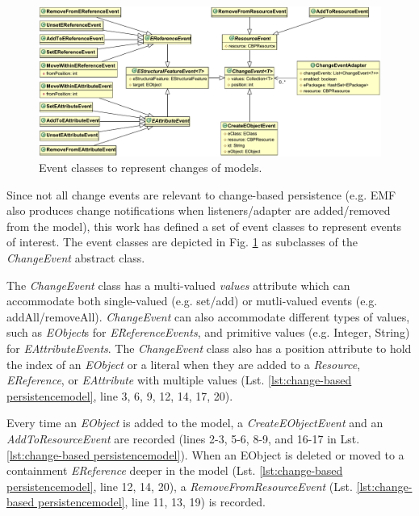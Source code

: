 \documentclass[12pt, a4paper]{report} \usepackage[titletoc]{appendix}
\begin{document}
\begin{figure}[th]
	\centering
	\includegraphics[width=\linewidth]{events}
	\caption{Event classes to represent changes of models.}
	\label{fig:events}
\end{figure}

Since not all change events are relevant to change-based persistence (e.g. EMF also produces change notifications when listeners/adapter are added/removed from the model), this work has defined a set of event classes to represent events of interest. The event classes are depicted in Fig. \ref{fig:events} as subclasses of the \emph{ChangeEvent} abstract class. 

The \emph{ChangeEvent} class has a multi-valued \emph{values} attribute which can accommodate both single-valued (e.g. set/add) or mutli-valued events (e.g. addAll/removeAll). \emph{ChangeEvent} can also accommodate different types of values, such as \emph{EObject}s for \emph{EReferenceEvents}, and primitive values (e.g. Integer, String) for \emph{EAttributeEvents}. The \emph{ChangeEvent} class also has a position attribute to hold the index of an \emph{EObject} or a literal when they are added to a \emph{Resource}, \emph{EReference}, or \emph{EAttribute} with multiple values (Lst. \ref{lst:change-based persistencemodel}, line 3, 6, 9, 12, 14, 17, 20). 

Every time an \emph{EObject} is added to the model, a \emph{CreateEObjectEvent} and an \emph{AddToResourceEvent} are recorded (lines 2-3, 5-6, 8-9, and 16-17 in Lst. \ref{lst:change-based persistencemodel}). When an EObject is deleted or moved to a containment \emph{EReference} deeper in the model (Lst. \ref{lst:change-based persistencemodel}, line 12, 14, 20), a \emph{RemoveFromResourceEvent} (Lst. \ref{lst:change-based persistencemodel}, line 11, 13, 19) is recorded.
\end{document}

